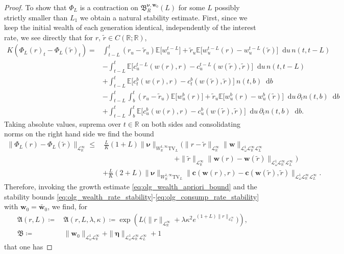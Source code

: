 \documentclass[11pt,oneside,english,reqno,dvipsnames,table]{amsart}
\numberwithin{equation}{section}
\theoremstyle{plain}
\theoremstyle{definition}
\theoremstyle{remark}
\theoremstyle{plain}
\theoremstyle{plain}
\theoremstyle{plain}
\theoremstyle{plain}
\theoremstyle{plain}
\theoremstyle{plain}
\theoremstyle{plain}
\newcommand{\TV}{\text{TV}}
\newcommand{\bc}{\mathbf{c}}
\newcommand{\bw}{\mathbf{w}}
\newcommand{\fB}{\mathfrak{B}}
\newcommand{\dd}{\mathop{}\!\mathrm{d}}
\newcommand{\mbE}{\mathbb{E}}
\newcommand{\mbR}{\mathbb{R}}
\newcommand{\mfA}{\mathfrak{A}}
\newcommand{\mfB}{\mathfrak{B}}
\newcommand{\msL}{\mathscr{L}}
\newcommand{\bmeta}{\boldsymbol{\eta}}
\newcommand{\bnu}{\boldsymbol{\nu}}
\numberwithin{thm}{section}
\begin{document}
\begin{proof}
To show that $\Phi_L$ is a contraction on $  \fB^{\bnu,\bw_0}_R(L)$ for some $L$ possibly strictly smaller than $L_1$ we obtain a natural stability estimate. First, since we keep the initial wealth of each generation identical, independently of the interest rate, we see directly that for $r,\,\tilde{r} \in C(\mbR;\mbR)$,
%
 \begin{align*}
      K\left(\Phi_L(r)_t-\Phi_L(\tilde{r})_t\right) =& \int_{t-L}^{t} (r_u-\tilde{r}_u) \mbE\big[w^{t-L}_u\big] + \tilde{r}_u\mbE\big[w^{t-L}_u(r) - w^{t-L}_u(\tilde{r})\big]\dd u \,n(t,t-L) \\
       &- \int_{t-L}^{t}\mbE\big[c^{t-L}_u(w(r),r)-c^{t-L}_u(w(\tilde{r}),\tilde{r})\big] \dd u \,n(t,t-L)\\
       &+ \int_{t-L}^{t} \mbE\big[ c^b_{t}(w(r),r)- c^b_t(w(\tilde{r}),\tilde{r})\big] \ n(t,b)\dd b\\
       &- \int_{t-L}^{t} \int_b^{t} (r_u -\tilde{r}_u)\mbE\big[w^b_u(r)\big] +\tilde{r}_u \mbE\big[w^b_u(r)-w^b_u(\tilde{r})\big] \dd u \, \partial_t n(t,b)\dd b\\
       &+\int_{t-L}^t \int_b^t \mbE\big[c^b_u(w(r),r)-c^b_u(w(\tilde{r}),\tilde{r})\big] \dd u \, \partial_t n(t,b)\dd b.
   \end{align*}
%
Taking absolute values, suprema over $t\in \mbR$ on both sides and consolidating norms on the right hand side we find the bound
%
 \begin{align*}
       \|\Phi_L(r)-\Phi_L(\tilde{r})\|_{\msL^\infty_{\mbR}} \leq &\,  \frac{L}{K}(1+L)\|\bnu\|_{W^{1,\infty}_{\mbR}\TV_L}\bigg(\|r-\tilde{r}\|_{\msL^\infty_\mbR} \|\bw\|_{\msL^1_\omega \msL^\infty_{\mbR}\msL^\infty_L} \\
       &\qquad \qquad \qquad \qquad \qquad  + \|\tilde{r}\|_{\msL^\infty_{\mbR}}\|\bw(r) - \bw(\tilde{r})\|_{\msL^1_\omega \msL^\infty_{\mbR}\msL^\infty_L} \bigg)\\
       &+\frac{L}{K}(2+L)\|\bnu\|_{W^{1,\infty}_{\mbR}\TV_L}  \|\bc(\bw(r),r)-\bc(\bw(\tilde{r}),\tilde{r})\|_{\msL^1_\omega \msL^\infty_{\mbR}\msL^\infty_L}.
   \end{align*}
%
Therefore, invoking the growth estimate \eqref{eq:olg_wealth_apriori_bound} and the stability bounds \eqref{eq:olg_wealth_rate_stability}-\eqref{eq:olg_consump_rate_stability} with $\bw_0 = \tilde{\bw_0}$, we find, for 
%
\begin{align*}
    \mfA(r,L)\coloneqq &\, \mfA(r,L,\lambda,\kappa) \coloneqq \exp\left(L\big(\|r\|_{\msL^\infty_\mbR} + \lambda \kappa^2 e^{(1+L)\|r\|_{\msL^\infty_{\mbR}} } \big)\right),\\
    \mfB \coloneqq  &\, \|\bw_0\|_{\msL^1_\omega \msL^\infty_\mbR } +    \|\bmeta\|_{ \msL^1_\omega \msL^\infty_{\mbR} \msL^\infty_{L}} + 1 
\end{align*}
%
that one has
%


\end{proof}
\end{document}
